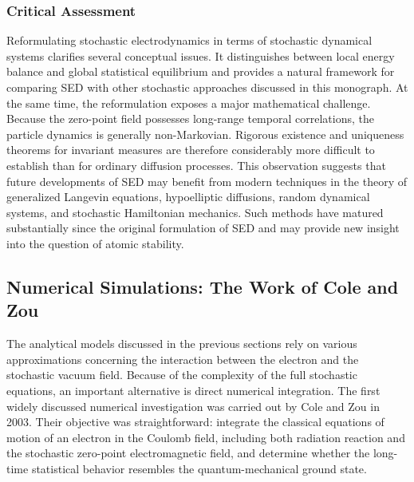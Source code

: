 \subsubsection*{Critical Assessment}
Reformulating stochastic electrodynamics in terms of stochastic
dynamical systems clarifies several conceptual issues. It distinguishes
between local energy balance and global statistical equilibrium and
provides a natural framework for comparing SED with other stochastic
approaches discussed in this monograph.
At the same time, the reformulation exposes a major mathematical
challenge. Because the zero-point field possesses long-range temporal
correlations, the particle dynamics is generally non-Markovian.
Rigorous existence and uniqueness theorems for invariant measures are
therefore considerably more difficult to establish than for ordinary
diffusion processes.
This observation suggests that future developments of SED may benefit
from modern techniques in the theory of generalized Langevin equations,
hypoelliptic diffusions, random dynamical systems, and stochastic
Hamiltonian mechanics. Such methods have matured substantially since the
original formulation of SED and may provide new insight into the
question of atomic stability.
\subsection{Numerical Simulations: The Work of Cole and Zou}
\label{sec:ColeZou}
The analytical models discussed in the previous sections rely on various
approximations concerning the interaction between the electron and the
stochastic vacuum field. Because of the complexity of the full
stochastic equations, an important alternative is direct numerical
integration.
The first widely discussed numerical investigation was carried out by
Cole and Zou in 2003. Their objective was straightforward: integrate the
classical equations of motion of an electron in the Coulomb field,
including both radiation reaction and the stochastic zero-point
electromagnetic field, and determine whether the long-time statistical
behavior resembles the quantum-mechanical ground state.
